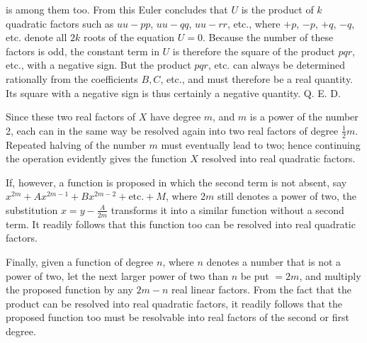 is among them too. From this Euler concludes that $U$ is the product of $k$ quadratic factors such as $uu-pp$, $uu-qq$, $uu-rr$, etc., where $+p$, $-p$, $+q$, $-q$, etc. denote all $2k$ roots of the equation $U=0$. Because the number of these factors is odd, the constant term in $U$ is therefore the square of the product $pqr$, etc., with a negative sign. But the product $pqr$, etc. can always be determined rationally from the coefficients $B,C$, etc., and must therefore be a real quantity. Its square with a negative sign is thus certainly a negative quantity. Q. E. D.

Since these two real factors of $X$ have degree $m$, and $m$ is a power of the number 2, each can in the same way be resolved again into two real factors of degree $\frac12m$. Repeated halving of the number $m$ must eventually lead to two; hence continuing the operation evidently gives the function $X$ resolved into real quadratic factors.

If, however, a function is proposed in which the second term is not absent, say $x^{2m}+Ax^{2m-1}+Bx^{2m-2}+\text{etc.}+M$, where $2m$ still denotes a power of two, the substitution $x=y-\frac{A}{2m}$ transforms it into a similar function without a second term. It readily follows that this function too can be resolved into real quadratic factors.

Finally, given a function of degree $n$, where $n$ denotes a number that is not
a power of two, let the next larger power of two than $n$ be put $=2m$, and multiply the proposed function by any $2m-n$ real linear factors. From the fact that the product can be resolved into real quadratic factors, it readily follows that the proposed function too must be resolvable into real factors of the second or first degree.
